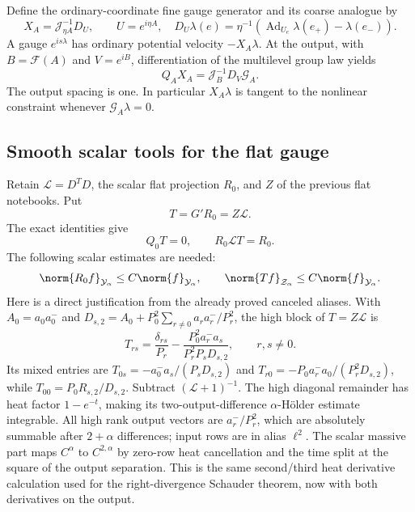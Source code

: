 Define the ordinary-coordinate fine gauge generator and its
coarse analogue by
\begin{equation}\label{ng-generators}
 X_A=\mathcal J_{\eta A}^{-1}D_U,
 \qquad U=e^{i\eta A},\quad
 D_U\lambda(e)=\eta^{-1}
       (\operatorname{Ad}_{U_e}\lambda(e_+)-\lambda(e_-)).
\end{equation}
A gauge $e^{is\lambda}$ has ordinary potential velocity
$-X_A\lambda$. At the output, with $B=\mathcal F(A)$ and
$V=e^{iB}$, differentiation of the multilevel group law yields
\begin{equation}\label{ng-gauge-intertwining}
 Q_AX_A=\mathcal J_B^{-1}D_V\mathcal G_A.
\end{equation}
The output spacing is one. In particular $X_A\lambda$ is tangent
to the nonlinear constraint whenever $\mathcal G_A\lambda=0$.

\subsection{Smooth scalar tools for the flat gauge}

Retain $\mathcal L=D^TD$, the scalar flat projection $R_0$, and
$Z$ of the previous flat notebooks. Put
\begin{equation}\label{ng-T-definition}
 T=G'R_0=Z\mathcal L.
\end{equation}
The exact identities give
\begin{equation}\label{ng-T-identities}
 Q_0T=0,\qquad R_0\mathcal L T=R_0.
\end{equation}
The following scalar estimates are needed:
\begin{equation}\label{ng-scalar-bounds}
 \norm{R_0f}_{\mathcal Y_\alpha}\le C\norm{f}_{\mathcal Y_\alpha},
 \qquad
 \norm{Tf}_{\mathcal Z_\alpha}\le C\norm{f}_{\mathcal Y_\alpha}.
\end{equation}
Here is a direct justification from the already proved canceled
aliases. With $A_0=a_0a_0^-$ and
$D_{s,2}=A_0+P_0^2\sum_{r\ne0}a_ra_r^-/P_r^2$, the high block of
$T=Z\mathcal L$ is
\[
 T_{rs}=\frac{\delta_{rs}}{P_r}
       -\frac{P_0^2a_r^-a_s}{P_r^2P_sD_{s,2}},\qquad r,s\ne0.
\]
Its mixed entries are
$T_{0s}=-a_0^-a_s/(P_sD_{s,2})$ and
$T_{r0}=-P_0a_r^-a_0/(P_r^2D_{s,2})$, while
$T_{00}=P_0R_{s,2}/D_{s,2}$.
Subtract $(\mathcal L+1)^{-1}$. The high diagonal remainder has
heat factor $1-e^{-t}$, making its two-output-difference
$\alpha$-H\"older estimate integrable. All high rank output
vectors are $a_r^-/P_r^2$, which are absolutely summable after
$2+\alpha$ differences; input rows are in alias $\ell^2$.
The scalar massive part maps $C^\alpha$ to $C^{2,\alpha}$ by
zero-row heat cancellation and the time split at the square of
the output separation. This is the same second/third heat
derivative calculation used for the right-divergence Schauder
theorem, now with both derivatives on the output.

